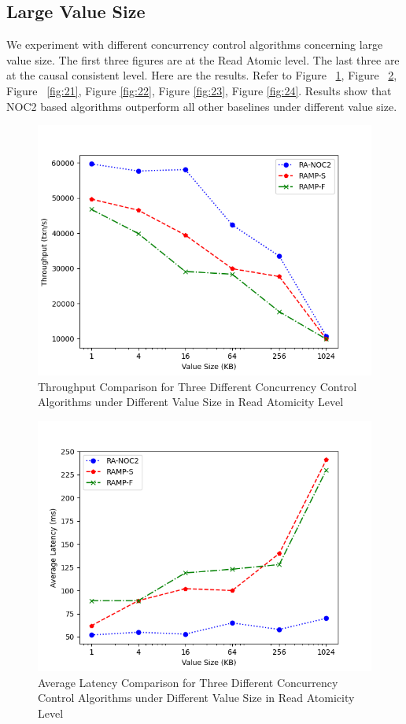 \subsection{Large Value Size}

We experiment with different concurrency control algorithms concerning large value size. The first three figures are at the Read Atomic level. The last three are at the causal consistent level. Here are the results. Refer to Figure ~\ref{fig:19}, Figure ~\ref{fig:20}, Figure ~\ref{fig:21}, Figure \ref{fig:22}, Figure \ref{fig:23}, Figure \ref{fig:24}. 
 Results show that NOC2 based algorithms outperform all other baselines under different value size.
\begin{figure}[H]
    \centering
    \includegraphics[width=0.8\linewidth]{figure/5-ra-t.png}
    \caption{Throughput Comparison for Three Different Concurrency Control Algorithms under Different Value Size in Read Atomicity Level}
    \label{fig:19}
\end{figure}
\begin{figure}[H]
    \centering
    \includegraphics[width=0.8\linewidth]{figure/5-ra-al.png}
    \caption{Average Latency Comparison for Three Different Concurrency Control Algorithms under Different Value Size in Read Atomicity Level}
    \label{fig:20}
\end{figure}
